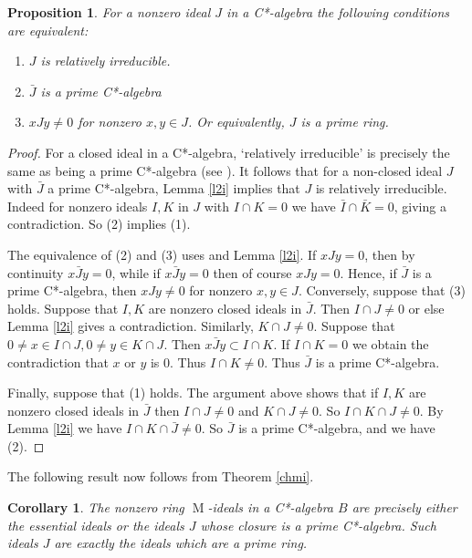 \documentclass[11pt,leqno]{amsart}
\DeclareMathOperator{\m}{M}
\newtheorem{proposition}[theorem]{Proposition}
\newtheorem{corollary}[theorem]{Corollary}
\theoremstyle{definition}
\theoremstyle{remark}
\numberwithin{equation}{section}
\numberwithin{equation}{section}
\begin{document}
\begin{proposition}
\label{proC} For a nonzero  ideal $J$ in a   C*-algebra the following conditions are equivalent:
\begin{enumerate}
\item $J$ is relatively irreducible.
		
\item  $\bar{J}$ is a prime C*-algebra
\item $x J y \neq 0$ for nonzero $x, y \in J$.  Or equivalently, $J$ is a prime ring. 
\end{enumerate}
\end{proposition}

\begin{proof} For a closed ideal in a C*-algebra, `relatively irreducible' is precisely the same as being a prime C*-algebra (see \cite[Definition II.5.4.4]{Bla06}).
It follows that for a non-closed ideal $J$ with $\bar{J}$ a prime C*-algebra, Lemma \ref{l2i}  implies that $J$ is relatively irreducible.  Indeed for nonzero ideals $I, K$ in $J$ with $I\cap K=0$ we have $\bar{I} \cap \bar{K} = 0$, giving a 
contradiction.  So (2) implies (1).

The equivalence of (2) and (3) uses  \cite[Proposition II.5.4.5]{Bla06} and Lemma \ref{l2i}.  If $xJy =  0$, then by continuity $x \bar{J} y = 0$, while if $x \bar{J} y = 0$ then of course $x J y =  0$.  Hence, if $\bar{J}$ is a prime C*-algebra, then $xJy \neq 0$ for nonzero $x, y \in J$.  Conversely, suppose that (3)
holds.   Suppose that 
 $I, K$ are nonzero closed ideals in $\bar{J}$.  Then 
$I \cap J \neq 0$ or else Lemma \ref{l2i} gives a contradiction.  Similarly, $K \cap J \neq 0$.  
Suppose that $0 \neq x \in I \cap J,
0 \neq y \in K \cap J$.  Then $x \bar{J} y \subset I \cap K$.  If $I \cap K = 0$ we obtain the contradiction that $x$ or $y$ is 0.   Thus $I \cap K \neq 0$.  Thus $\bar{J}$ is a prime C*-algebra. 

Finally, suppose that (1) holds.  The argument above shows that if 
$I, K$ are nonzero closed ideals in $\bar{J}$ then 
$I \cap J \neq 0$ and  $K \cap J \neq 0$.  So $I \cap K \cap J 
\neq 0$. By Lemma  \ref{l2i} we have 
$I \cap K \cap \bar{J} \neq  0$. So 
  $\bar{J}$ is a prime C*-algebra, and we have (2).
\end{proof}

The following result now follows from Theorem \ref{chmi}.

\begin{corollary}
\label{nck}
The nonzero ring $\m$-ideals in a C*-algebra $B$ are precisely either the essential ideals or the ideals $J$ whose closure is a prime  C*-algebra.   Such ideals $J$ are exactly the ideals which are a prime ring. 
\end{corollary}
\end{document}

